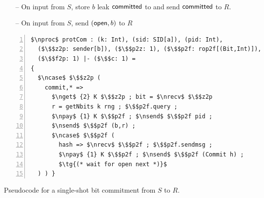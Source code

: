 \begin{figure}
\centering
\begin{minipage}{0.5\textwidth}
\begin{bbox}[title={Functionality $\F_{\m{com}}(S, R)$}]
~
\begin{itemize}
\item[--] On input  from $S$, store $b$ leak $\mathsf{committed}$ to \A and send $\mathsf{committed}$ to $R$.
\item[--] On input  from $S$, send $(\mathsf{open}, b)$ to $R$
\end{itemize}
%
%
%
%
\end{bbox}
\end{minipage}
\hspace{3em}
\begin{minipage}{0.5\textwidth}
\begin{lstlisting}[basicstyle=\scriptsize\BeraMonottFamily, frame=single, mathescape, numbers=left, xleftmargin=2em, xrightmargin=2em]
$\nproc$ protCom : (k: Int), (sid: SID[a]), (pid: Int),
  ($\$$z2p: sender[b]), ($\$$p2z: 1), ($\$$p2f: rop2f[(Bit,Int)]), 
  ($\$$f2p: 1) |- ($\$$c: 1) =
{
  $\ncase$ $\$$z2p (
    commit,* =>
      $\nget$ {2} K $\$$z2p ; bit = $\nrecv$ $\$$z2p 
      r = getNbits k rng ; $\$$p2f.query ;
      $\npay$ {1} K $\$$p2f ; $\nsend$ $\$$p2f pid ;
      $\nsend$ $\$$p2f (b,r) ;
      $\ncase$ $\$$p2f (
        hash => $\nrecv$ $\$$p2f ; $\$$p2f.sendmsg ;
        $\npay$ {1} K $\$$p2f ; $\nsend$ $\$$p2f (Commit h) ;
        $\tg{(* wait for open next *)}$
  ) ) }
\end{lstlisting}
\end{minipage}
\caption{Pseudocode for a single-shot bit commitment from $S$ to $R$.}
\label{fig:fcomideal}
\end{figure}
